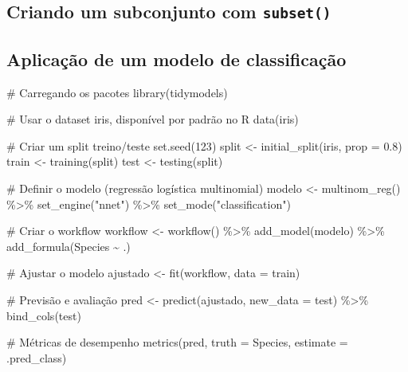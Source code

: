 \documentclass[
  12pt,
  letterpaper,
  DIV=11,
  numbers=noendperiod]{scrreprt}
\newenvironment{Shaded}{\begin{snugshade}}{\end{snugshade}}
\newcommand{\AttributeTok}[1]{\textcolor[rgb]{0.40,0.45,0.13}{#1}}
\newcommand{\CommentTok}[1]{\textcolor[rgb]{0.37,0.37,0.37}{#1}}
\newcommand{\DecValTok}[1]{\textcolor[rgb]{0.68,0.00,0.00}{#1}}
\newcommand{\FloatTok}[1]{\textcolor[rgb]{0.68,0.00,0.00}{#1}}
\newcommand{\FunctionTok}[1]{\textcolor[rgb]{0.28,0.35,0.67}{#1}}
\newcommand{\NormalTok}[1]{\textcolor[rgb]{0.00,0.23,0.31}{#1}}
\newcommand{\OtherTok}[1]{\textcolor[rgb]{0.00,0.23,0.31}{#1}}
\newcommand{\SpecialCharTok}[1]{\textcolor[rgb]{0.37,0.37,0.37}{#1}}
\newcommand{\StringTok}[1]{\textcolor[rgb]{0.13,0.47,0.30}{#1}}
\theoremstyle{definition}
\theoremstyle{exemplo}
\begin{document}
\subsection{\texorpdfstring{Criando um subconjunto com
\texttt{subset()}}{Criando um subconjunto com subset()}}\label{criando-um-subconjunto-com-subset}

\subsection{Aplicação de um modelo de
classificação}\label{aplicauxe7uxe3o-de-um-modelo-de-classificauxe7uxe3o}

\begin{Shaded}
\begin{Highlighting}[]
\CommentTok{\# Carregando os pacotes}
\FunctionTok{library}\NormalTok{(tidymodels)}



\CommentTok{\# Usar o dataset iris, disponível por padrão no R}
\FunctionTok{data}\NormalTok{(iris)}

\CommentTok{\# Criar um split treino/teste}
\FunctionTok{set.seed}\NormalTok{(}\DecValTok{123}\NormalTok{)}
\NormalTok{split }\OtherTok{\textless{}{-}} \FunctionTok{initial\_split}\NormalTok{(iris, }\AttributeTok{prop =} \FloatTok{0.8}\NormalTok{)}
\NormalTok{train }\OtherTok{\textless{}{-}} \FunctionTok{training}\NormalTok{(split)}
\NormalTok{test }\OtherTok{\textless{}{-}} \FunctionTok{testing}\NormalTok{(split)}

\CommentTok{\# Definir o modelo (regressão logística multinomial)}
\NormalTok{modelo }\OtherTok{\textless{}{-}} \FunctionTok{multinom\_reg}\NormalTok{() }\SpecialCharTok{\%\textgreater{}\%}
  \FunctionTok{set\_engine}\NormalTok{(}\StringTok{"nnet"}\NormalTok{) }\SpecialCharTok{\%\textgreater{}\%}
  \FunctionTok{set\_mode}\NormalTok{(}\StringTok{"classification"}\NormalTok{)}

\CommentTok{\# Criar o workflow}
\NormalTok{workflow }\OtherTok{\textless{}{-}} \FunctionTok{workflow}\NormalTok{() }\SpecialCharTok{\%\textgreater{}\%}
  \FunctionTok{add\_model}\NormalTok{(modelo) }\SpecialCharTok{\%\textgreater{}\%}
  \FunctionTok{add\_formula}\NormalTok{(Species }\SpecialCharTok{\textasciitilde{}}\NormalTok{ .)}

\CommentTok{\# Ajustar o modelo}
\NormalTok{ajustado }\OtherTok{\textless{}{-}} \FunctionTok{fit}\NormalTok{(workflow, }\AttributeTok{data =}\NormalTok{ train)}

\CommentTok{\# Previsão e avaliação}
\NormalTok{pred }\OtherTok{\textless{}{-}} \FunctionTok{predict}\NormalTok{(ajustado, }\AttributeTok{new\_data =}\NormalTok{ test) }\SpecialCharTok{\%\textgreater{}\%}
  \FunctionTok{bind\_cols}\NormalTok{(test)}

\CommentTok{\# Métricas de desempenho}
\FunctionTok{metrics}\NormalTok{(pred, }\AttributeTok{truth =}\NormalTok{ Species, }\AttributeTok{estimate =}\NormalTok{ .pred\_class)}
\end{Highlighting}
\end{Shaded}
\end{document}
